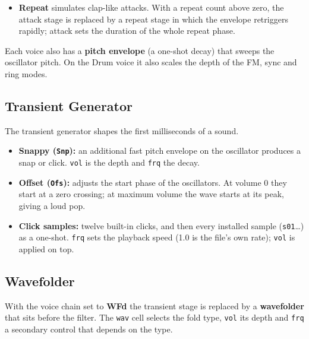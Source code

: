 \begin{itemize}
\tightlist
\item
  \textbf{Repeat} simulates clap-like attacks. With a repeat count above
  zero, the attack stage is replaced by a repeat stage in which the
  envelope retriggers rapidly; attack sets the duration of the whole
  repeat phase.
\end{itemize}


Each voice also has a \textbf{pitch envelope} (a one-shot decay) that
sweeps the oscillator pitch. On the Drum voice it also scales the depth
of the FM, sync and ring modes.

\subsection{Transient Generator}\label{transient-generator}

The transient generator shapes the first milliseconds of a sound.

\begin{itemize}
\tightlist
\item
  \textbf{Snappy (\texttt{Snp}):} an additional fast pitch envelope on
  the oscillator produces a snap or click. \texttt{vol} is the depth and
  \texttt{frq} the decay.
\item
  \textbf{Offset (\texttt{Ofs}):} adjusts the start phase of the
  oscillators. At volume 0 they start at a zero crossing; at maximum
  volume the wave starts at its peak, giving a loud pop.
\item
  \textbf{Click samples:} twelve built-in clicks, and then every
  installed sample (\texttt{s01}\ldots) as a one-shot. \texttt{frq} sets
  the playback speed (1.0 is the file's own rate); \texttt{vol} is
  applied on top.
\end{itemize}

\subsection{Wavefolder}\label{wavefolder}

With the voice chain set to \textbf{WFd} the transient stage is replaced
by a \textbf{wavefolder} that sits before the filter. The \texttt{wav}
cell selects the fold type, \texttt{vol} its depth and \texttt{frq} a
secondary control that depends on the type.

